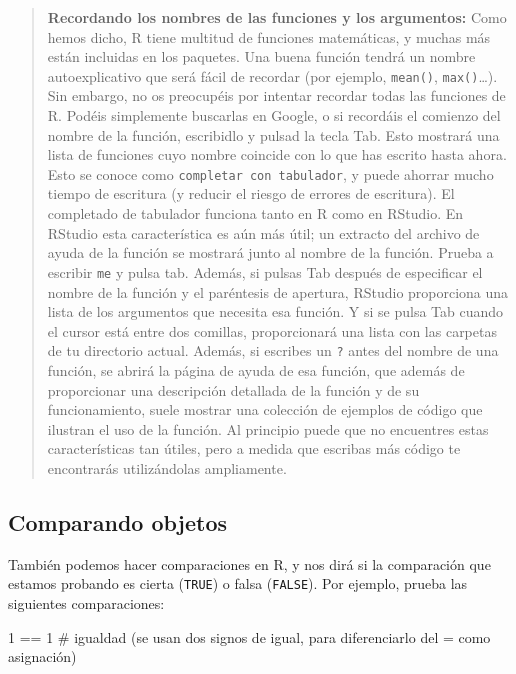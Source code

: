 \documentclass[
  letterpaper,
  DIV=11,
  numbers=noendperiod]{scrreprt}
\newenvironment{Shaded}{\begin{snugshade}}{\end{snugshade}}
\newcommand{\CommentTok}[1]{\textcolor[rgb]{0.37,0.37,0.37}{#1}}
\newcommand{\DecValTok}[1]{\textcolor[rgb]{0.68,0.00,0.00}{#1}}
\newcommand{\SpecialCharTok}[1]{\textcolor[rgb]{0.37,0.37,0.37}{#1}}
\begin{document}
\begin{quote}
\textbf{Recordando los nombres de las funciones y los argumentos:} Como
hemos dicho, R tiene multitud de funciones matemáticas, y muchas más
están incluidas en los paquetes. Una buena función tendrá un nombre
autoexplicativo que será fácil de recordar (por ejemplo,
\texttt{mean()}, \texttt{max()}\ldots). Sin embargo, no os preocupéis
por intentar recordar todas las funciones de R. Podéis simplemente
buscarlas en Google, o si recordáis el comienzo del nombre de la
función, escribidlo y pulsad la tecla Tab. Esto mostrará una lista de
funciones cuyo nombre coincide con lo que has escrito hasta ahora. Esto
se conoce como \texttt{completar\ con\ tabulador}, y puede ahorrar mucho
tiempo de escritura (y reducir el riesgo de errores de escritura). El
completado de tabulador funciona tanto en R como en RStudio. En RStudio
esta característica es aún más útil; un extracto del archivo de ayuda de
la función se mostrará junto al nombre de la función. Prueba a escribir
\texttt{me} y pulsa tab. Además, si pulsas Tab después de especificar el
nombre de la función y el paréntesis de apertura, RStudio proporciona
una lista de los argumentos que necesita esa función. Y si se pulsa Tab
cuando el cursor está entre dos comillas, proporcionará una lista con
las carpetas de tu directorio actual. Además, si escribes un \texttt{?}
antes del nombre de una función, se abrirá la página de ayuda de esa
función, que además de proporcionar una descripción detallada de la
función y de su funcionamiento, suele mostrar una colección de ejemplos
de código que ilustran el uso de la función. Al principio puede que no
encuentres estas características tan útiles, pero a medida que escribas
más código te encontrarás utilizándolas ampliamente.
\end{quote}

\hypertarget{comparando-objetos}{%
\subsection{Comparando objetos}\label{comparando-objetos}}

También podemos hacer comparaciones en R, y nos dirá si la comparación
que estamos probando es cierta (\texttt{TRUE}) o falsa (\texttt{FALSE}).
Por ejemplo, prueba las siguientes comparaciones:

\begin{Shaded}
\begin{Highlighting}[]
\DecValTok{1} \SpecialCharTok{==} \DecValTok{1}    \CommentTok{\# igualdad (se usan dos signos de igual, para diferenciarlo del \textasciigrave{}=\textasciigrave{} como asignación)}
\end{Highlighting}
\end{Shaded}
\end{document}

